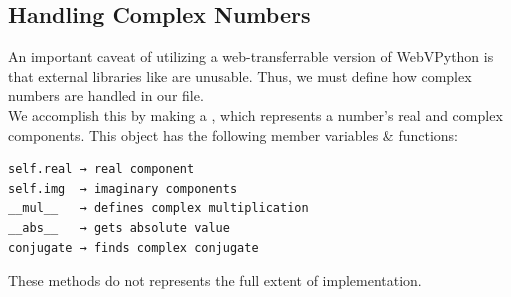 \documentclass[twocolumn]{article}
\newcommand{\en}{\vspace{0.25cm}\\}
\begin{document}
\subsection{Handling Complex Numbers}
An important caveat of utilizing a web-transferrable version of WebVPython is that external libraries like  are unusable. Thus, we must define how complex numbers are handled in our file. \en
We accomplish this by making a , which represents a number's real and complex components. This object has the following member variables \& functions:
\begin{verbatim}
self.real → real component
self.img  → imaginary components
__mul__   → defines complex multiplication
__abs__   → gets absolute value
conjugate → finds complex conjugate
\end{verbatim}
These methods do not represents the full extent of implementation. 
\end{document}
